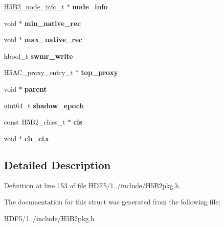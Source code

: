 \begin{DoxyCompactItemize}
\hyperlink{struct_h5_b2__node__info__t}{H5\+B2\+\_\+node\+\_\+info\+\_\+t} $\ast$ {\bfseries node\+\_\+info}
\item 
\mbox{\label{struct_h5_b2__hdr__t_a8e735a5c21579394ba8b91717dcc4908}} 
void $\ast$ {\bfseries min\+\_\+native\+\_\+rec}
\item 
\mbox{\label{struct_h5_b2__hdr__t_a273dd679322f25f457bb08a20cd4fca7}} 
void $\ast$ {\bfseries max\+\_\+native\+\_\+rec}
\item 
\mbox{\label{struct_h5_b2__hdr__t_a01600fa350679cbd7ed603f0ba620f90}} 
hbool\+\_\+t {\bfseries swmr\+\_\+write}
\item 
\mbox{\label{struct_h5_b2__hdr__t_a8eac967721de9b525b159c9b317591d9}} 
H5\+A\+C\+\_\+proxy\+\_\+entry\+\_\+t $\ast$ {\bfseries top\+\_\+proxy}
\item 
\mbox{\label{struct_h5_b2__hdr__t_a2533ee8a6e044b2fc415994196392d2e}} 
void $\ast$ {\bfseries parent}
\item 
\mbox{\label{struct_h5_b2__hdr__t_a6b62c62c61c680694c163a3a56145203}} 
uint64\+\_\+t {\bfseries shadow\+\_\+epoch}
\item 
\mbox{\label{struct_h5_b2__hdr__t_a3dbd395a54debef3e54f60f5710e259c}} 
const H5\+B2\+\_\+class\+\_\+t $\ast$ {\bfseries cls}
\item 
\mbox{\label{struct_h5_b2__hdr__t_a532acdd9cbc306304653412a518b2dd4}} 
void $\ast$ {\bfseries cb\+\_\+ctx}
\end{DoxyCompactItemize}


\subsection{Detailed Description}


Definition at line \hyperlink{_h_d_f5_21_810_81_2include_2_h5_b2pkg_8h_source_l00153}{153} of file \hyperlink{_h_d_f5_21_810_81_2include_2_h5_b2pkg_8h_source}{H\+D\+F5/1../include/\+H5\+B2pkg.\+h}.



The documentation for this struct was generated from the following file\+:\begin{DoxyCompactItemize}
\item 
H\+D\+F5/1../include/\+H5\+B2pkg.\+h\end{DoxyCompactItemize}
